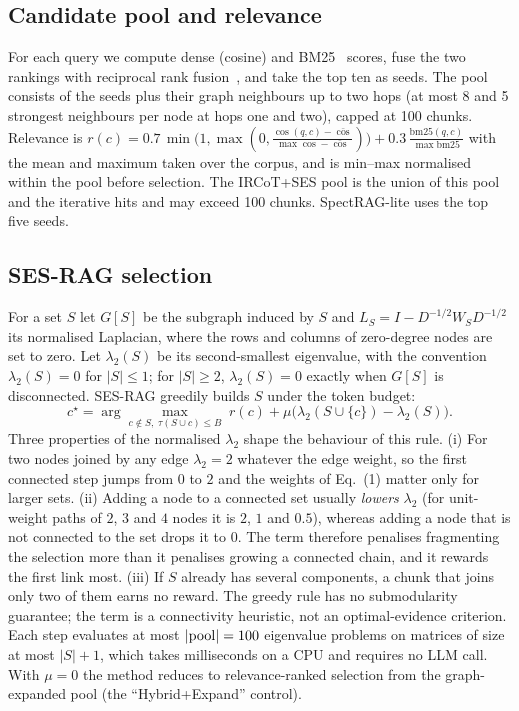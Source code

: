 \subsection{Candidate pool and relevance}
For each query we compute dense (cosine) and BM25~\cite{robertson2009bm25} scores, fuse the two rankings with reciprocal rank fusion~\cite{cormack2009rrf}, and take the top ten as seeds. The pool consists of the seeds plus their graph neighbours up to two hops (at most 8 and 5 strongest neighbours per node at hops one and two), capped at 100 chunks. Relevance is $r(c)=0.7\,\min\!\big(1,\max(0,\tfrac{\cos(q,c)-\bar{\cos}}{\max\cos-\bar{\cos}})\big)+0.3\,\tfrac{\mathrm{bm25}(q,c)}{\max\mathrm{bm25}}$ with the mean and maximum taken over the corpus, and is min--max normalised within the pool before selection. The IRCoT+SES pool is the union of this pool and the iterative hits and may exceed 100 chunks. SpectRAG-lite uses the top five seeds.

\subsection{SES-RAG selection}
For a set $S$ let $G[S]$ be the subgraph induced by $S$ and $L_S=I-D^{-1/2}W_SD^{-1/2}$ its normalised Laplacian, where the rows and columns of zero-degree nodes are set to zero. Let $\lambda_2(S)$ be its second-smallest eigenvalue, with the convention $\lambda_2(S)=0$ for $|S|\le 1$; for $|S|\ge 2$, $\lambda_2(S)=0$ exactly when $G[S]$ is disconnected. SES-RAG greedily builds $S$ under the token budget:
\begin{equation}
c^\star=\arg\max_{c\notin S,\;\tau(S\cup c)\le B}\; r(c)+\mu\big(\lambda_2(S\cup\{c\})-\lambda_2(S)\big).
\label{eq:ses}
\end{equation}
Three properties of the normalised $\lambda_2$ shape the behaviour of this rule. (i) For two nodes joined by any edge $\lambda_2=2$ whatever the edge weight, so the first connected step jumps from $0$ to $2$ and the weights of Eq.~(1) matter only for larger sets. (ii) Adding a node to a connected set usually \emph{lowers} $\lambda_2$ (for unit-weight paths of $2$, $3$ and $4$ nodes it is $2$, $1$ and $0.5$), whereas adding a node that is not connected to the set drops it to $0$. The term therefore penalises fragmenting the selection more than it penalises growing a connected chain, and it rewards the first link most. (iii) If $S$ already has several components, a chunk that joins only two of them earns no reward. The greedy rule has no submodularity guarantee; the term is a connectivity heuristic, not an optimal-evidence criterion. Each step evaluates at most $|{\rm pool}|=100$ eigenvalue problems on matrices of size at most $|S|+1$, which takes milliseconds on a CPU and requires no LLM call. With $\mu=0$ the method reduces to relevance-ranked selection from the graph-expanded pool (the ``Hybrid+Expand'' control).

